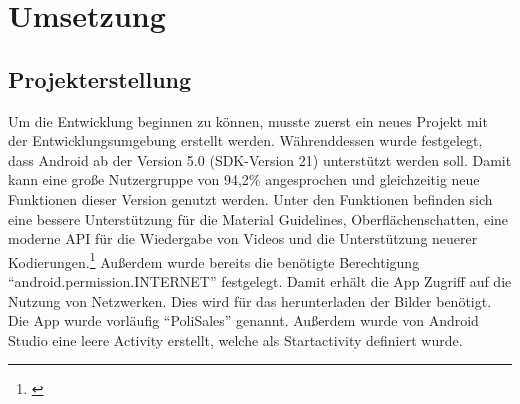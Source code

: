 

\clearpage

\section{Umsetzung}

\subsection{Projekterstellung}

Um die Entwicklung beginnen zu können, musste zuerst ein neues Projekt mit der Entwicklungsumgebung erstellt werden. Währenddessen wurde festgelegt, dass Android ab der Version 5.0 (\gls{SDK}-Version 21) unterstützt werden soll. Damit kann eine große Nutzergruppe von {94,2\%} angesprochen und gleichzeitig neue Funktionen dieser Version genutzt werden. Unter den Funktionen befinden sich eine bessere Unterstützung für die Material Guidelines, Oberflächenschatten, eine moderne \gls{API} für die Wiedergabe von Videos und die Unterstützung neuerer Kodierungen.\footnote{\cite[Vgl.][]{AndroidFive2021}} Außerdem wurde bereits die benötigte Berechtigung \enquote{android.permission.INTERNET} festgelegt. Damit erhält die App Zugriff auf die Nutzung von Netzwerken. Dies wird für das herunterladen der Bilder benötigt. Die App wurde vorläufig \enquote{PoliSales} genannt. Außerdem wurde von Android Studio eine leere Activity erstellt, welche als Startactivity definiert wurde.

